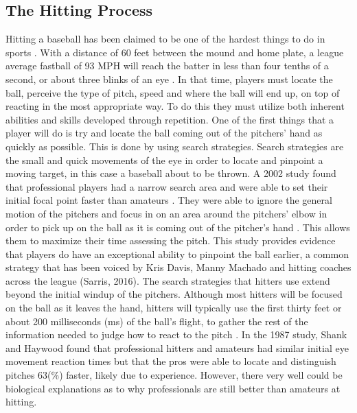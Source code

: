 \documentclass{article}
\begin{document}
\begin{doublespace}
\section{The Hitting Process}
Hitting a baseball has been claimed to be one of the hardest things to do in sports \citep{Regan}. With a distance of 60 feet between the mound and home plate, a league average fastball of 93 MPH will reach the batter in less than four tenths of a second, or about three blinks of an eye \citep{Shank}. In that time, players must locate the ball, perceive the type of pitch, speed and where the ball will end up, on top of reacting in the most appropriate way. To do this they must utilize both inherent abilities and skills developed through repetition. One of the first things that a player will do is try and locate the ball coming out of the pitchers’ hand as quickly as possible. This is done by using search strategies. Search strategies are the small and quick movements of the eye in order to locate and pinpoint a moving target, in this case a baseball about to be thrown. A 2002 study found that professional players had a narrow search area and were able to set their initial focal point faster than amateurs \citep{Kato}. They were able to ignore the general motion of the pitchers and focus in on an area around the pitchers’ elbow in order to pick up on the ball as it is coming out of the pitcher’s hand \citep{Kato}. This allows them to maximize their time assessing the pitch. This study provides evidence that players do have an exceptional ability to pinpoint the ball earlier, a common strategy that has been voiced by Kris Davis, Manny Machado and hitting coaches across the league (Sarris, 2016). The search strategies that hitters use extend beyond the initial windup of the pitchers. Although most hitters will be focused on the ball as it leaves the hand, hitters will typically use the first thirty feet or about 200 milliseconds (ms) of the ball’s flight, to gather the rest of the information needed to judge how to react to the pitch \citep{Shank}. In the 1987 study, Shank and Haywood found that professional hitters and amateurs had similar initial eye movement reaction times but that the pros were able to locate and distinguish pitches 63(\%) faster, likely due to experience. However, there very well could be biological explanations as to why professionals are still better than amateurs at hitting. 

\end{doublespace}
\end{document}
